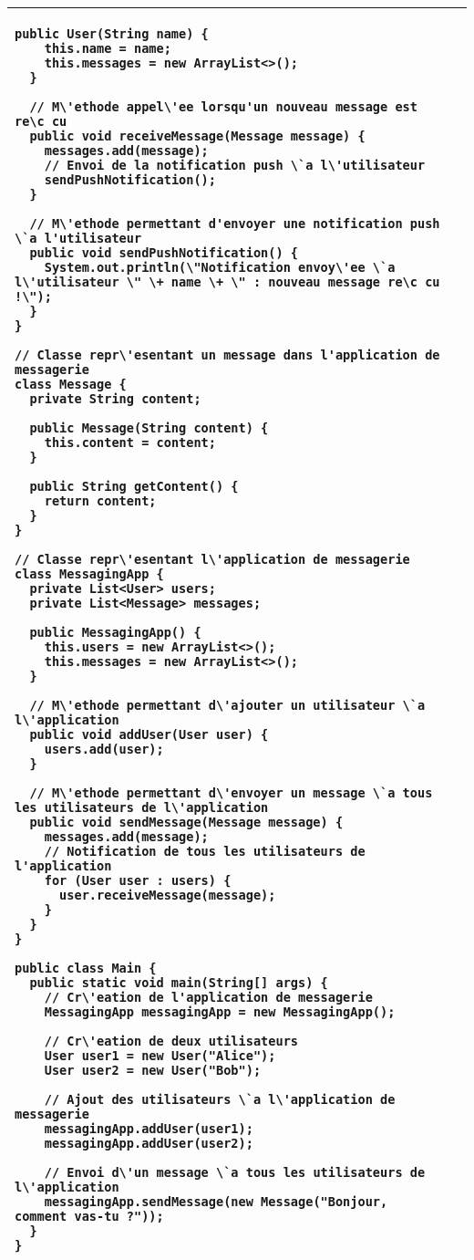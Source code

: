 \begin{table}[H]
\begin{adjustbox}{max width=\textwidth}
\begin{tabular}{l|p{\textwidth}}
\begin{minipage}[tr]{0.5\textwidth}
\begin{minipage}[b]{1\textwidth}
\begin{lstlisting}[style=monstyle]
  public User(String name) {
    this.name = name;
    this.messages = new ArrayList<>();
  }

  // M\'ethode appel\'ee lorsqu'un nouveau message est re\c cu
  public void receiveMessage(Message message) {
    messages.add(message);
    // Envoi de la notification push \`a l\'utilisateur
    sendPushNotification();
  }

  // M\'ethode permettant d'envoyer une notification push \`a l'utilisateur
  public void sendPushNotification() {
    System.out.println(\"Notification envoy\'ee \`a l\'utilisateur \" \+ name \+ \" : nouveau message re\c cu !\");
  }
}

// Classe repr\'esentant un message dans l'application de messagerie
class Message {
  private String content;

  public Message(String content) {
    this.content = content;
  }

  public String getContent() {
    return content;
  }
}

// Classe repr\'esentant l\'application de messagerie
class MessagingApp {
  private List<User> users;
  private List<Message> messages;

  public MessagingApp() {
    this.users = new ArrayList<>();
    this.messages = new ArrayList<>();
  }

  // M\'ethode permettant d\'ajouter un utilisateur \`a l\'application
  public void addUser(User user) {
    users.add(user);
  }

  // M\'ethode permettant d\'envoyer un message \`a tous les utilisateurs de l\'application
  public void sendMessage(Message message) {
    messages.add(message);
    // Notification de tous les utilisateurs de l'application
    for (User user : users) {
      user.receiveMessage(message);
    }
  }
}

public class Main {
  public static void main(String[] args) {
    // Cr\'eation de l'application de messagerie
    MessagingApp messagingApp = new MessagingApp();

    // Cr\'eation de deux utilisateurs
    User user1 = new User("Alice");
    User user2 = new User("Bob");

    // Ajout des utilisateurs \`a l\'application de messagerie
    messagingApp.addUser(user1);
    messagingApp.addUser(user2);

    // Envoi d\'un message \`a tous les utilisateurs de l\'application
    messagingApp.sendMessage(new Message("Bonjour, comment vas-tu ?"));
  }
}

\end{lstlisting}
\end{minipage}
\end{minipage}
\\
\bottomrule
\end{tabular}
\end{adjustbox}
\end{table}
